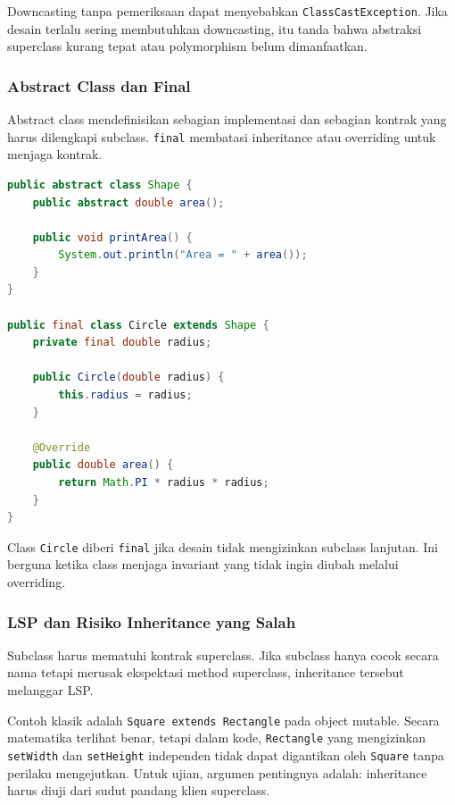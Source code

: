 Downcasting tanpa pemeriksaan dapat menyebabkan \texttt{ClassCastException}. Jika desain terlalu sering membutuhkan downcasting, itu tanda bahwa abstraksi superclass kurang tepat atau polymorphism belum dimanfaatkan.

\subsubsection{Abstract Class dan Final}

\begin{jawab}
Abstract class mendefinisikan sebagian implementasi dan sebagian kontrak yang harus dilengkapi subclass. \texttt{final} membatasi inheritance atau overriding untuk menjaga kontrak.
\end{jawab}

\begin{lstlisting}[language=Java, caption={Abstract class dan abstract method}, label={lst:abstract-class}]
public abstract class Shape {
    public abstract double area();

    public void printArea() {
        System.out.println("Area = " + area());
    }
}

public final class Circle extends Shape {
    private final double radius;

    public Circle(double radius) {
        this.radius = radius;
    }

    @Override
    public double area() {
        return Math.PI * radius * radius;
    }
}
\end{lstlisting}

Class \texttt{Circle} diberi \texttt{final} jika desain tidak mengizinkan subclass lanjutan. Ini berguna ketika class menjaga invariant yang tidak ingin diubah melalui overriding.

\subsubsection{LSP dan Risiko Inheritance yang Salah}

\begin{jawab}
Subclass harus mematuhi kontrak superclass. Jika subclass hanya cocok secara nama tetapi merusak ekspektasi method superclass, inheritance tersebut melanggar LSP.
\end{jawab}

Contoh klasik adalah \texttt{Square extends Rectangle} pada object mutable. Secara matematika terlihat benar, tetapi dalam kode, \texttt{Rectangle} yang mengizinkan \texttt{setWidth} dan \texttt{setHeight} independen tidak dapat digantikan oleh \texttt{Square} tanpa perilaku mengejutkan. Untuk ujian, argumen pentingnya adalah: inheritance harus diuji dari sudut pandang klien superclass.

